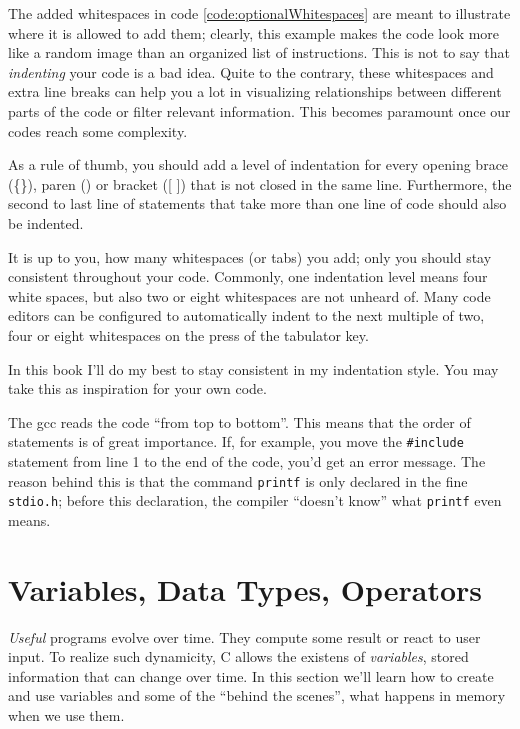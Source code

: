 \begin{hintbox}
The added whitespaces in code \ref{code:optionalWhitespaces} are meant to illustrate where it is allowed to add them; clearly, this example makes the code look more like a random image than an organized list of instructions. This is not to say that \emph{indenting} your code is a bad idea. Quite to the contrary, these whitespaces and extra line breaks can help you a lot in visualizing relationships between different parts of the code or filter relevant information. This becomes paramount once our codes reach some complexity.

As a rule of thumb, you should add a level of indentation for every opening brace (\{\}), paren () or bracket ([ ]) that is not closed in the same line. Furthermore, the second to last line of statements that take more than one line of code should also be indented.

It is up to you, how many whitespaces (or tabs) you add; only you should stay consistent throughout your code. Commonly, one indentation level means four white spaces, but also two or eight whitespaces are not unheard of. Many code editors can be configured to automatically indent to the next multiple of two, four or eight whitespaces on the press of the tabulator key.

In this book I'll do my best to stay consistent in my indentation style. You may take this as inspiration for your own code.
\end{hintbox}

The gcc reads the code \enquote{from top to bottom}. This means that the order of statements is of great importance. If, for example, you move the \texttt{\#include} statement from line 1 to the end of the code, you'd get an error message. The reason behind this is that the command \texttt{printf} is only declared in the fine \texttt{stdio.h}; before this declaration, the compiler \enquote{doesn't know} what \texttt{printf} even means.

\section{Variables, Data Types, Operators} \label{sec:expressions}
\emph{Useful} programs evolve over time. They compute some result or react to user input. To realize such dynamicity, C allows the existens of \emph{variables}, \ie stored information that can change over time. In this section we'll learn how to create and use variables and some of the \enquote{behind the scenes}, \ie what happens in memory when we use them.

